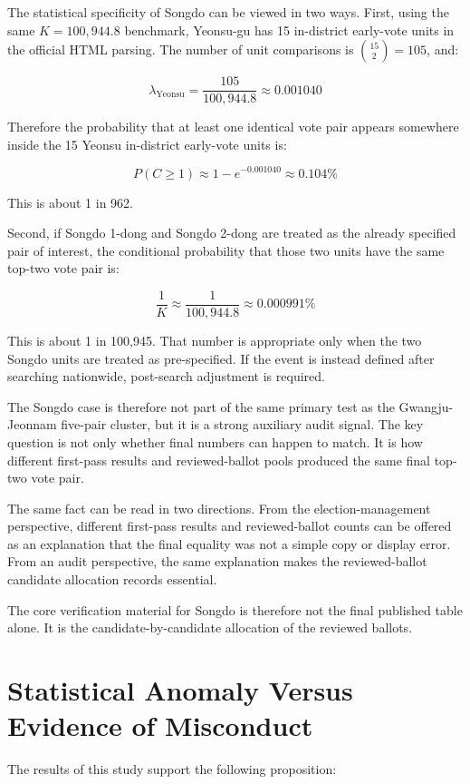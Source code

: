 \documentclass[preprint]{IEIE}
\begin{document}
The statistical specificity of Songdo can be viewed in two ways. First, using the same \(K=100,944.8\) benchmark, Yeonsu-gu has 15 in-district early-vote units in the official HTML parsing. The number of unit comparisons is \(\binom{15}{2}=105\), and:

\[
\lambda_{\text{Yeonsu}} = \frac{105}{100,944.8} \approx 0.001040
\]

Therefore the probability that at least one identical vote pair appears somewhere inside the 15 Yeonsu in-district early-vote units is:

\[
P(C \ge 1) \approx 1-e^{-0.001040} \approx 0.104\%
\]

This is about 1 in 962.

Second, if Songdo 1-dong and Songdo 2-dong are treated as the already specified pair of interest, the conditional probability that those two units have the same top-two vote pair is:

\[
\frac{1}{K} \approx \frac{1}{100,944.8} \approx 0.000991\%
\]

This is about 1 in 100,945. That number is appropriate only when the two Songdo units are treated as pre-specified. If the event is instead defined after searching nationwide, post-search adjustment is required.

The Songdo case is therefore not part of the same primary test as the Gwangju-Jeonnam five-pair cluster, but it is a strong auxiliary audit signal. The key question is not only whether final numbers can happen to match. It is how different first-pass results and reviewed-ballot pools produced the same final top-two vote pair.

The same fact can be read in two directions. From the election-management perspective, different first-pass results and reviewed-ballot counts can be offered as an explanation that the final equality was not a simple copy or display error. From an audit perspective, the same explanation makes the reviewed-ballot candidate allocation records essential.

The core verification material for Songdo is therefore not the final published table alone. It is the candidate-by-candidate allocation of the reviewed ballots.

\section{Statistical Anomaly Versus Evidence of Misconduct}

The results of this study support the following proposition:
\end{document}
